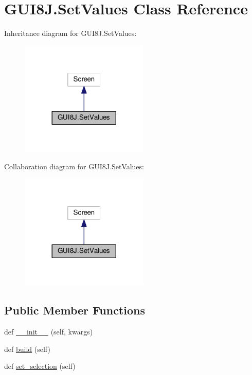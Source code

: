 \hypertarget{classGUI8J_1_1SetValues}{}\section{G\+U\+I8\+J.\+Set\+Values Class Reference}
\label{classGUI8J_1_1SetValues}


Inheritance diagram for G\+U\+I8\+J.\+Set\+Values\+:
\nopagebreak
\begin{figure}[H]
\begin{center}
\leavevmode
\includegraphics[width=173pt]{classGUI8J_1_1SetValues__inherit__graph}
\end{center}
\end{figure}


Collaboration diagram for G\+U\+I8\+J.\+Set\+Values\+:
\nopagebreak
\begin{figure}[H]
\begin{center}
\leavevmode
\includegraphics[width=173pt]{classGUI8J_1_1SetValues__coll__graph}
\end{center}
\end{figure}
\subsection*{Public Member Functions}
\begin{DoxyCompactItemize}
\item 
def \hyperlink{classGUI8J_1_1SetValues_a50aecbed585d5eb0dd5d48e810b89303}{\+\_\+\+\_\+init\+\_\+\+\_\+} (self, kwargs)
\item 
def \hyperlink{classGUI8J_1_1SetValues_ac327a506ed4ef380a0e6cffdc7125a94}{build} (self)
\item 
def \hyperlink{classGUI8J_1_1SetValues_ad395153098290dc55aa98bb3cbe15a44}{set\+\_\+selection} (self)
\end{DoxyCompactItemize}
